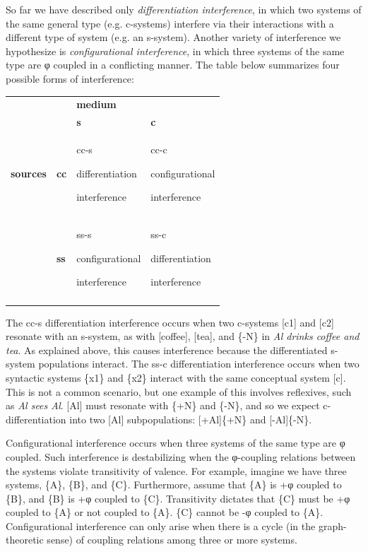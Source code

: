   So far we have described only \textit{differentiation interference}, in which two systems of the same general type (e.g. c-systems) interfere via their interactions with a different type of system (e.g. an s-system). Another variety of interference we hypothesize is \textit{configurational interference}, in which three systems of the same type are φ coupled in a conflicting manner. The table below summarizes four possible forms of interference:

\begin{tabularx}{\textwidth}{XXXX} &  & \textbf{medium} & \\
\lsptoprule
&  & \textbf{s} & \textbf{c}\\
\textbf{sources} & \textbf{cc} & cc-s

differentiation 

interference & cc-c

configurational

interference\\
& \textbf{ss} & ss-s

configurational

interference & ss-c

differentiation

interference\\
\lspbottomrule
\end{tabularx}
  The cc-s differentiation interference occurs when two c-systems [c1] and [c2] resonate with an s-system, as with [coffee], [tea], and \{-N\} in \textit{Al drinks coffee and tea}. As explained above, this causes interference because the differentiated s-system populations interact. The ss-c differentiation interference occurs when  two syntactic systems \{x1\} and \{x2\} interact with the same conceptual system [c]. This is not a common scenario, but one example of this involves reflexives, such as \textit{Al sees Al}. [Al] must resonate with \{+N\} and \{-N\}, and so we expect c-differentiation into two [Al] subpopulations: [+Al]\{+N\} and [-Al]\{-N\}.

  Configurational interference occurs when three systems of the same type are φ coupled. Such interference is destabilizing when the φ-coupling relations between the systems violate transitivity of valence. For example, imagine we have three systems, \{A\}, \{B\}, and \{C\}. Furthermore, assume that \{A\} is +φ coupled to \{B\}, and \{B\} is +φ coupled to \{C\}. Transitivity dictates that \{C\} must be +φ coupled to \{A\} or not coupled to \{A\}. \{C\} cannot be -φ coupled to \{A\}. Configurational interference can only arise when there is a cycle (in the graph-theoretic sense) of coupling relations among three or more systems. 

